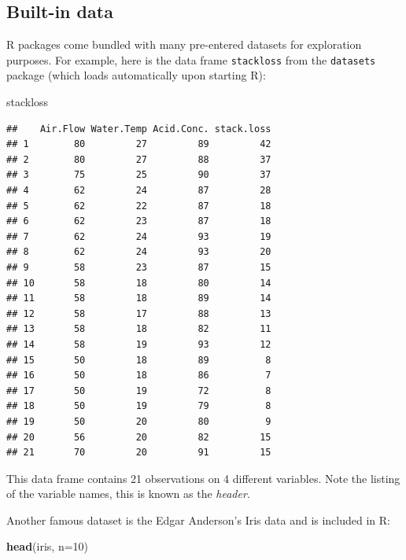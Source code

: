 \documentclass[
]{book}
\newenvironment{Shaded}{\begin{snugshade}}{\end{snugshade}}
\newcommand{\AttributeTok}[1]{\textcolor[rgb]{0.13,0.29,0.53}{#1}}
\newcommand{\DecValTok}[1]{\textcolor[rgb]{0.00,0.00,0.81}{#1}}
\newcommand{\FunctionTok}[1]{\textcolor[rgb]{0.13,0.29,0.53}{\textbf{#1}}}
\newcommand{\NormalTok}[1]{#1}
\begin{document}
\hypertarget{built-in-data}{%
\subsection{Built-in data}\label{built-in-data}}

R packages come bundled with many pre-entered datasets for exploration purposes. For example, here is the data frame \texttt{stackloss} from the \texttt{datasets} package (which loads automatically upon starting R):

\begin{Shaded}
\begin{Highlighting}[]
\NormalTok{stackloss}
\end{Highlighting}
\end{Shaded}

\begin{verbatim}
##    Air.Flow Water.Temp Acid.Conc. stack.loss
## 1        80         27         89         42
## 2        80         27         88         37
## 3        75         25         90         37
## 4        62         24         87         28
## 5        62         22         87         18
## 6        62         23         87         18
## 7        62         24         93         19
## 8        62         24         93         20
## 9        58         23         87         15
## 10       58         18         80         14
## 11       58         18         89         14
## 12       58         17         88         13
## 13       58         18         82         11
## 14       58         19         93         12
## 15       50         18         89          8
## 16       50         18         86          7
## 17       50         19         72          8
## 18       50         19         79          8
## 19       50         20         80          9
## 20       56         20         82         15
## 21       70         20         91         15
\end{verbatim}

This data frame contains 21 observations on 4 different variables. Note the listing of the variable names, this is known as the \emph{header}.

Another famous dataset is the Edgar Anderson's Iris data and is included in R:

\begin{Shaded}
\begin{Highlighting}[]
\FunctionTok{head}\NormalTok{(iris, }\AttributeTok{n=}\DecValTok{10}\NormalTok{)}
\end{Highlighting}
\end{Shaded}
\end{document}
